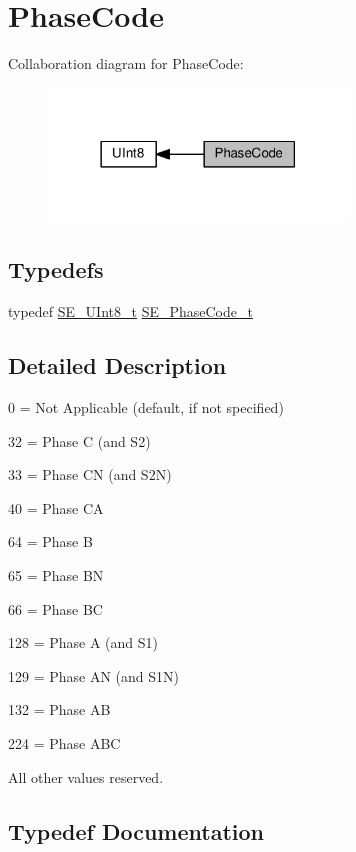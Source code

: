 \hypertarget{group__PhaseCode}{}\section{Phase\+Code}
\label{group__PhaseCode}
Collaboration diagram for Phase\+Code\+:\nopagebreak
\begin{figure}[H]
\begin{center}
\leavevmode
\includegraphics[width=225pt]{group__PhaseCode}
\end{center}
\end{figure}
\subsection*{Typedefs}
\begin{DoxyCompactItemize}
\item 
typedef \hyperlink{group__UInt8_gaf7c365a1acfe204e3a67c16ed44572f5}{S\+E\+\_\+\+U\+Int8\+\_\+t} \hyperlink{group__PhaseCode_ga3eb7ce6c8beb3531baf0ba7723a2782c}{S\+E\+\_\+\+Phase\+Code\+\_\+t}
\end{DoxyCompactItemize}


\subsection{Detailed Description}
0 = Not Applicable (default, if not specified)

32 = Phase C (and S2)

33 = Phase CN (and S2N)

40 = Phase CA

64 = Phase B

65 = Phase BN

66 = Phase BC

128 = Phase A (and S1)

129 = Phase AN (and S1N)

132 = Phase AB

224 = Phase A\+BC

All other values reserved. 

\subsection{Typedef Documentation}
\mbox{\label{group__PhaseCode_ga3eb7ce6c8beb3531baf0ba7723a2782c}} 
